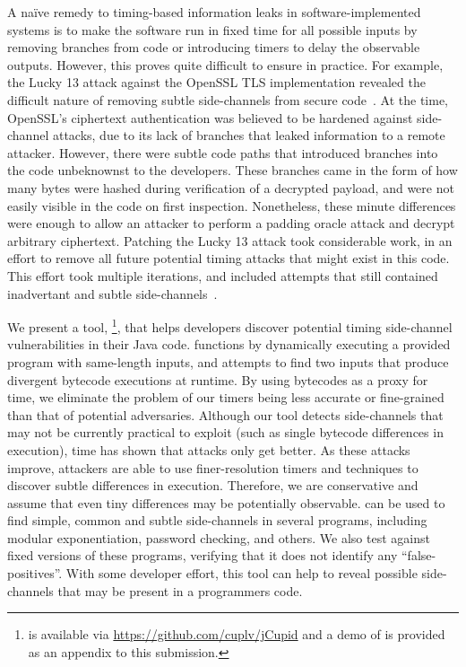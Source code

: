 A na\"ive remedy to timing-based information leaks in software-implemented
systems is to make the software run in fixed time for all possible inputs by
removing branches from code or
introducing timers to delay the observable outputs. 
However, this proves quite difficult to ensure in practice. For example, the Lucky 13
attack against the OpenSSL TLS implementation revealed the difficult nature of
removing subtle side-channels from secure code~\cite{al2013lucky}. At the time, OpenSSL's
ciphertext authentication was believed to be hardened against
side-channel attacks, due to its lack of branches that leaked information to a
remote attacker. However, there were subtle code paths that introduced branches
into the code unbeknownst to the developers. These branches came in the form of
how many bytes were hashed during verification of a decrypted payload, and were not easily
visible in the code on first inspection. Nonetheless, these minute differences
were enough to allow an attacker to perform a padding oracle attack and decrypt
arbitrary ciphertext. Patching the Lucky 13 attack took considerable work, in an
effort to remove all future potential timing attacks that might exist in this
code. This effort took multiple iterations, and included attempts that still
contained inadvertant and subtle side-channels~\cite{agl-lucky13}.

We present a tool, \jcupid\footnote{\jcupid is available via 
\url{https://github.com/cuplv/jCupid} and a demo of \jcupid is provided as
an appendix to this submission.}, that helps developers discover
potential timing side-channel vulnerabilities in their Java code. \jcupid
functions by dynamically executing a provided program with same-length inputs,
and attempts to find two inputs that produce divergent bytecode executions at
runtime. By using bytecodes as a proxy for time, we eliminate the problem of
our timers being less accurate or fine-grained than that of potential
adversaries. Although our tool detects side-channels that may not be currently
practical to exploit (such as single bytecode differences in execution), time has shown
that attacks only get better. As these attacks improve, attackers are
able to use finer-resolution timers and techniques to discover subtle
differences in execution. Therefore, we are conservative and assume that even
tiny differences may be potentially observable.
\jcupid can be used to find simple, common and subtle side-channels in several
programs, including modular exponentiation, password checking, and others. We
also test \jcupid against fixed versions of these programs, verifying that it
does not identify any ``false-positives''. With some developer effort, this tool
can help to reveal possible side-channels that may be present in a programmers
code.

